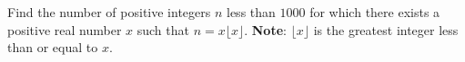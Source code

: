 Find the number of positive integers $n$ less than $1000$ for which there exists a positive real number $x$ such that $n = x \lfloor x \rfloor$.
\textbf{Note}: $\lfloor x \rfloor$ is the greatest integer less than or equal to $x$.